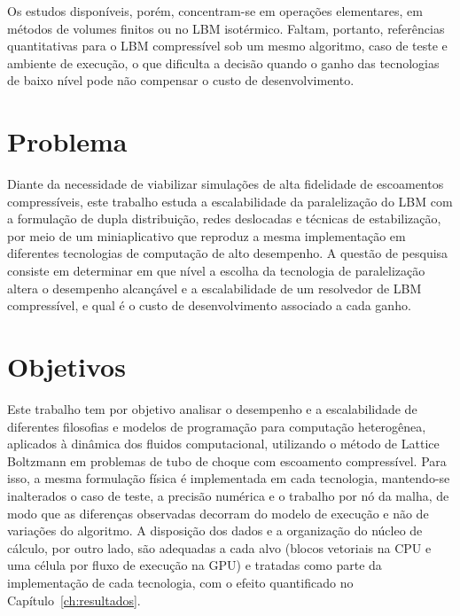 Os estudos disponíveis, porém, concentram-se em operações elementares, em métodos de volumes finitos ou no LBM isotérmico.
Faltam, portanto, referências quantitativas para o LBM compressível sob um mesmo algoritmo, caso de teste e ambiente de execução, o que dificulta a decisão quando o ganho das tecnologias de baixo nível pode não compensar o custo de desenvolvimento.


\section{Problema}\label{sec:problema}

Diante da necessidade de viabilizar simulações de alta fidelidade de escoamentos compressíveis, este trabalho estuda a escalabilidade da paralelização do LBM com a formulação de dupla distribuição, redes deslocadas e técnicas de estabilização, por meio de um miniaplicativo que reproduz a mesma implementação em diferentes tecnologias de computação de alto desempenho.
A questão de pesquisa consiste em determinar em que nível a escolha da tecnologia de paralelização altera o desempenho alcançável e a escalabilidade de um resolvedor de LBM compressível, e qual é o custo de desenvolvimento associado a cada ganho.


\section{Objetivos}\label{sec:objetivos}

Este trabalho tem por objetivo analisar o desempenho e a escalabilidade de diferentes filosofias e modelos de programação para computação heterogênea, aplicados à dinâmica dos fluidos computacional, utilizando o método de Lattice Boltzmann em problemas de tubo de choque com escoamento compressível.
Para isso, a mesma formulação física é implementada em cada tecnologia, mantendo-se inalterados o caso de teste, a precisão numérica e o trabalho por nó da malha, de modo que as diferenças observadas decorram do modelo de execução e não de variações do algoritmo.
A disposição dos dados e a organização do núcleo de cálculo, por outro lado, são adequadas a cada alvo (blocos vetoriais na CPU e uma célula por fluxo de execução na GPU) e tratadas como parte da implementação de cada tecnologia, com o efeito quantificado no Capítulo~\ref{ch:resultados}.

